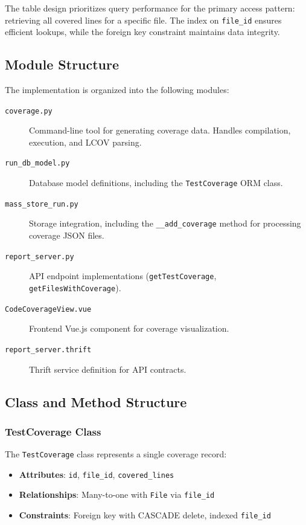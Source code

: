 The table design prioritizes query performance for the primary access pattern: retrieving all covered lines for a specific file. The index on \texttt{file\_id} ensures efficient lookups, while the foreign key constraint maintains data integrity.

\subsection{Module Structure}

The implementation is organized into the following modules:

\begin{description}
    \item[\texttt{coverage.py}] Command-line tool for generating coverage data. Handles compilation, execution, and LCOV parsing.
    
    \item[\texttt{run\_db\_model.py}] Database model definitions, including the \texttt{TestCoverage} ORM class.
    
    \item[\texttt{mass\_store\_run.py}] Storage integration, including the \texttt{\_\_add\_coverage} method for processing coverage JSON files.
    
    \item[\texttt{report\_server.py}] API endpoint implementations (\texttt{getTestCoverage}, \texttt{getFilesWithCoverage}).
    
    \item[\texttt{CodeCoverageView.vue}] Frontend Vue.js component for coverage visualization.
    
    \item[\texttt{report\_server.thrift}] Thrift service definition for API contracts.
\end{description}

\subsection{Class and Method Structure}

\subsubsection{TestCoverage Class}

The \texttt{TestCoverage} class represents a single coverage record:

\begin{itemize}
    \item \textbf{Attributes}: \texttt{id}, \texttt{file\_id}, \texttt{covered\_lines}
    \item \textbf{Relationships}: Many-to-one with \texttt{File} via \texttt{file\_id}
    \item \textbf{Constraints}: Foreign key with CASCADE delete, indexed \texttt{file\_id}
\end{itemize}

